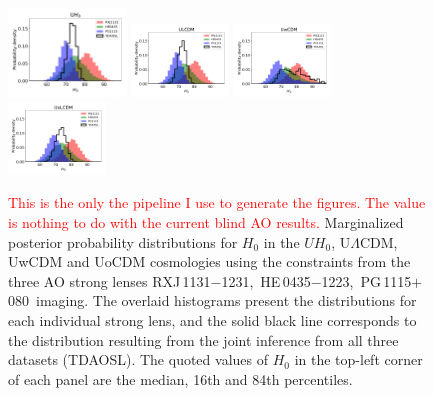 \documentclass[useAMS,usenatbib]{mnras}
\newcommand\todo[1]{\textcolor{red}{#1}}
\newcommand\rxj{RXJ\,1131$-$1231}
\newcommand\he{HE\,0435$-$1223}
\newcommand\pg{PG\,1115$+$080}
\begin{document}
\begin{figure}
  \centering
  \includegraphics[width=0.28\textwidth,trim=0 0 0 0, clip]{UH0.pdf}
  \includegraphics[width=0.23\textwidth, trim=82 0 0 0,clip]{ULCDM.pdf}
  \includegraphics[width=0.23\textwidth,trim=82 0 0 0,clip]{UwCDM.pdf}
  \includegraphics[width=0.23\textwidth,trim=82 0 0 0, clip]{UoLCDM.pdf}
  \caption{\todo{This is the only the pipeline I use to generate the figures. The value is nothing to do with the current blind AO results.} Marginalized posterior probability distributions for $H_{0}$ in the $UH_{0}$, U$\Lambda$CDM, UwCDM and UoCDM cosmologies using the constraints from the three AO strong lenses \rxj,~\he,~\pg~imaging. The overlaid histograms present the distributions for each individual strong lens, and the solid black line corresponds to the distribution resulting from the joint inference from all three datasets (TDAOSL). The quoted values of $H_{0}$ in the top-left corner of each panel are the median, 16th and 84th percentiles.}
\label{fig:uniformcosmologies}
\end{figure}
\end{document}
